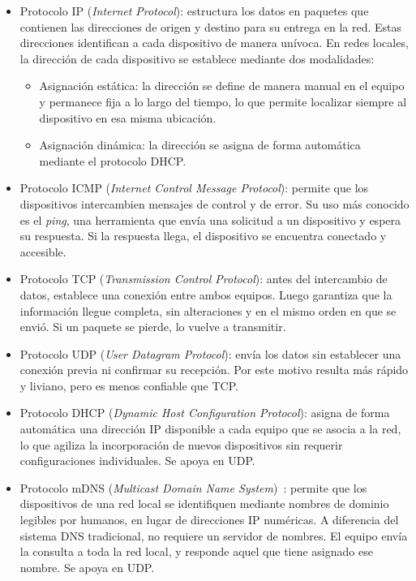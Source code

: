 \begin{itemize}
    \item Protocolo IP (\textit{Internet Protocol}): estructura los datos en paquetes que contienen las direcciones de origen y destino para su entrega en la red. Estas direcciones identifican a cada dispositivo de manera unívoca. En redes locales, la dirección de cada dispositivo se establece mediante dos modalidades:
    \begin{itemize}
        \item Asignación estática: la dirección se define de manera manual en el equipo y permanece fija a lo largo del tiempo, lo que permite localizar siempre al dispositivo en esa misma ubicación.
        \item Asignación dinámica: la dirección se asigna de forma automática mediante el protocolo DHCP.
    \end{itemize}

    \item Protocolo ICMP (\textit{Internet Control Message Protocol}): permite que los dispositivos intercambien mensajes de control y de error. Su uso más conocido es el \emph{ping}, una herramienta que envía una solicitud a un dispositivo y espera su respuesta. Si la respuesta llega, el dispositivo se encuentra conectado y accesible.

    \item Protocolo TCP (\textit{Transmission Control Protocol}): antes del intercambio de datos, establece una conexión entre ambos equipos. Luego garantiza que la información llegue completa, sin alteraciones y en el mismo orden en que se envió. Si un paquete se pierde, lo vuelve a transmitir.

    \item Protocolo UDP (\textit{User Datagram Protocol}): envía los datos sin establecer una conexión previa ni confirmar su recepción. Por este motivo resulta más rápido y liviano, pero es menos confiable que TCP.

    \item Protocolo DHCP (\textit{Dynamic Host Configuration Protocol}): asigna de forma automática una dirección IP disponible a cada equipo que se asocia a la red, lo que agiliza la incorporación de nuevos dispositivos sin requerir configuraciones individuales. Se apoya en UDP.

    \item Protocolo mDNS (\textit{Multicast Domain Name System})~\cite{rfc6762}: permite que los dispositivos de una red local se identifiquen mediante nombres de dominio legibles por humanos, en lugar de direcciones IP numéricas. A diferencia del sistema DNS tradicional, no requiere un servidor de nombres. El equipo envía la consulta a toda la red local, y responde aquel que tiene asignado ese nombre. Se apoya en UDP.


\end{itemize}
